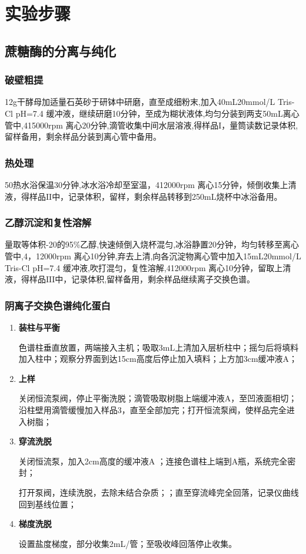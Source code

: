 \section{实验步骤}

\subsection{蔗糖酶的分离与纯化}
\subsubsection{破壁粗提}
12g干酵母加适量石英砂于研钵中研磨，直至成细粉末,加入40mL20mmol/L Tris-Cl pH=7.4 缓冲液，继续研磨10分钟，至成为糊状液体,均匀分装到两支50mL离心管中,4\dc 15000rpm 离心20分钟,滴管收集中间水层溶液,得样品$\mathrm{I}$，量筒读数记录体积,留样备用，剩余样品分装到离心管中备用。
\subsubsection{热处理}
50\dc 热水浴保温30分钟,冰水浴冷却至室温，4\dc  12000rpm 离心15分钟，倾倒收集上清液，得样品$\mathrm{II}$中，记录体积，留样，剩余样品转移到250mL烧杯中冰浴备用。
\subsubsection{乙醇沉淀和复性溶解}
量取等体积-20\dc 的95\%乙醇,快速倾倒入烧杯混匀,冰浴静置20分钟，均匀转移至离心管中,4\dc ，12000rpm 离心10分钟,弃去上清,向各沉淀物离心管中加入15mL20mmol/L Tris-Cl pH=7.4 缓冲液,吹打混匀，复性溶解,4\dc  12000rpm 离心10分钟，留取上清液，得样品$\mathrm{III}$中，记录体积,留样备用，剩余样品继续离子交换色谱。
\subsubsection{阴离子交换色谱纯化蛋白}

\begin{enumerate}
\item \textbf{装柱与平衡}
\par 色谱柱垂直放置，两端接入主机；吸取3mL上清加入层析柱中；摇匀后将填料加入柱中；观察分界面到达15cm高度后停止加入填料；上方加3cm缓冲液A；
\item  \textbf{上样}
   \par 关闭恒流泵阀，停止平衡洗脱；滴管吸取树脂上端缓冲液A，至凹液面相切；沿柱壁用滴管缓慢加入样品3，直至全部加完；打开恒流泵阀，使样品完全进入树脂；
\item \textbf{穿流洗脱}
    \par 关闭恒流泵，加入2cm高度的缓冲液A ；连接色谱柱上端到A瓶，系统完全密封；
    \par 打开泵阀，连续洗脱，去除未结合杂质；；直至穿流峰完全回落，记录仪曲线回到基线位置；
\item \textbf{梯度洗脱}
 \par 设置盐度梯度，部分收集2mL/管；至吸收峰回落停止收集。
\end{enumerate}

